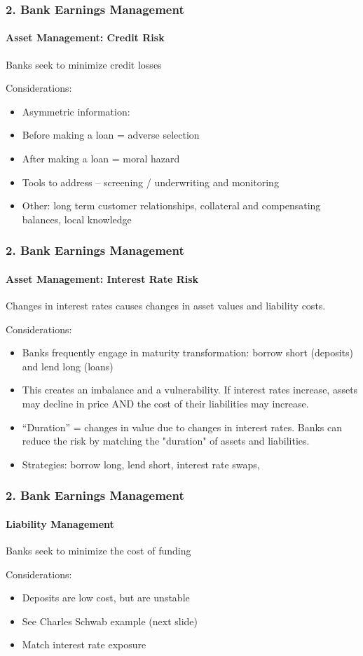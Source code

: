 \documentclass{beamer}
\begin{document}
\begin{frame}[t]
\frametitle{2. Bank Earnings Management}
\framesubtitle{Asset Management: Credit Risk}

    Banks seek to minimize credit losses
    \vspace{1em}

    Considerations:
    \begin{itemize}
        \item Asymmetric information:
        \item Before making a loan = adverse selection
        \item After making a loan = moral hazard
        \item Tools to address – screening / underwriting and monitoring
        \item Other: long term customer relationships, collateral and compensating balances, local knowledge
    \end{itemize}

\end{frame}

\begin{frame}[t]
\frametitle{2. Bank Earnings Management}
\framesubtitle{Asset Management: Interest Rate Risk}

    Changes in interest rates causes changes in asset values and liability costs.
    \vspace{1em}


    Considerations:
    \begin{itemize}
        \item Banks frequently engage in maturity transformation: borrow short (deposits) and lend long (loans)
        \item This creates an imbalance and a vulnerability.  If interest rates increase, assets may decline in price AND the cost of their liabilities may increase.
        \item “Duration” = changes in value due to changes in interest rates.   Banks can reduce the risk by matching the "duration" of assets and liabilities.
        \item Strategies: borrow long, lend short, interest rate swaps, 
    \end{itemize}

\end{frame}

\begin{frame}[t]
\frametitle{2. Bank Earnings Management}
\framesubtitle{Liability Management}

    Banks seek to minimize the cost of funding
    \vspace{1em}
    
    Considerations:
    \begin{itemize}
        \item Deposits are low cost, but are unstable
        \item See Charles Schwab example (next slide)
        \item Match interest rate exposure
    \end{itemize}

\end{frame}
\end{document}
